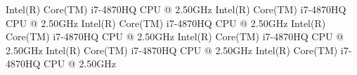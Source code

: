 Intel(R) Core(TM) i7-4870HQ CPU @ 2.50GHz
Intel(R) Core(TM) i7-4870HQ CPU @ 2.50GHz
Intel(R) Core(TM) i7-4870HQ CPU @ 2.50GHz
Intel(R) Core(TM) i7-4870HQ CPU @ 2.50GHz
Intel(R) Core(TM) i7-4870HQ CPU @ 2.50GHz
Intel(R) Core(TM) i7-4870HQ CPU @ 2.50GHz
Intel(R) Core(TM) i7-4870HQ CPU @ 2.50GHz
